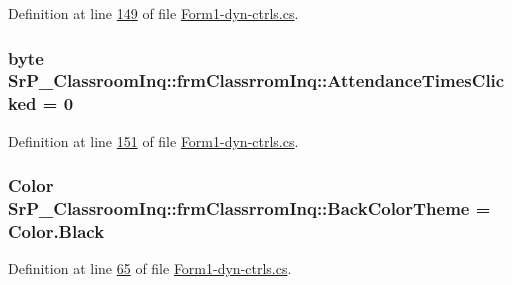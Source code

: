 \-Definition at line \hyperlink{_form1-dyn-ctrls_8cs_source_l00149}{149} of file \hyperlink{_form1-dyn-ctrls_8cs_source}{\-Form1-\/dyn-\/ctrls.\-cs}.

\hypertarget{class_sr_p___classroom_inq_1_1frm_classrrom_inq_ade18c1a241b76944c2731681e1767652}{
\subsubsection[{\-Attendance\-Times\-Clicked}]{\setlength{\rightskip}{0pt plus 5cm}byte {\bf \-Sr\-P\-\_\-\-Classroom\-Inq\-::frm\-Classrrom\-Inq\-::\-Attendance\-Times\-Clicked} = 0}}
\label{class_sr_p___classroom_inq_1_1frm_classrrom_inq_ade18c1a241b76944c2731681e1767652}


\-Definition at line \hyperlink{_form1-dyn-ctrls_8cs_source_l00151}{151} of file \hyperlink{_form1-dyn-ctrls_8cs_source}{\-Form1-\/dyn-\/ctrls.\-cs}.

\hypertarget{class_sr_p___classroom_inq_1_1frm_classrrom_inq_a29b5dc6ea05e60bb2577a5bef3532d7b}{
\subsubsection[{\-Back\-Color\-Theme}]{\setlength{\rightskip}{0pt plus 5cm}\-Color {\bf \-Sr\-P\-\_\-\-Classroom\-Inq\-::frm\-Classrrom\-Inq\-::\-Back\-Color\-Theme} = \-Color.\-Black}}
\label{class_sr_p___classroom_inq_1_1frm_classrrom_inq_a29b5dc6ea05e60bb2577a5bef3532d7b}


\-Definition at line \hyperlink{_form1-dyn-ctrls_8cs_source_l00065}{65} of file \hyperlink{_form1-dyn-ctrls_8cs_source}{\-Form1-\/dyn-\/ctrls.\-cs}.

